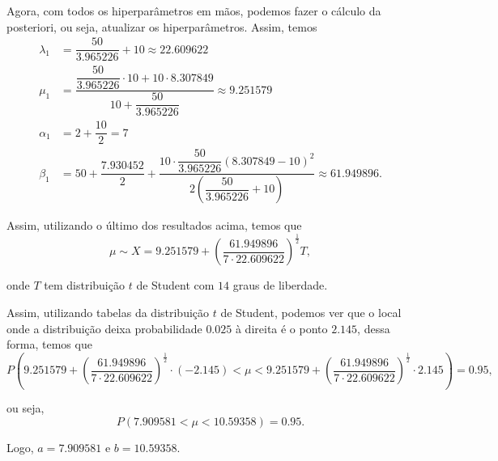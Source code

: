 \documentclass{article}
\begin{document}
Agora, com todos os hiperparâmetros em mãos, podemos fazer o cálculo da posteriori, ou seja, atualizar os hiperparâmetros. Assim, temos
\begin{equation*}
    \begin{split}
        \lambda_1 & = \dfrac{50}{3.965226} + 10 \approx 22.609622 \\
        \mu_1 & = \dfrac{\dfrac{50}{3.965226}\cdot 10 + 10\cdot 8.307849}{10 + \dfrac{50}{3.965226}} \approx 9.251579 \\
        \alpha_1 & = 2 + \dfrac{10}{2} = 7 \\
        \beta_1 & = 50 + \dfrac{7.930452}{2} + \dfrac{10\cdot \dfrac{50}{3.965226}\left(8.307849 - 10\right)^2}{2\left(\dfrac{50}{3.965226} + 10\right)} \approx 61.949896.
    \end{split}
\end{equation*}

Assim, utilizando o último dos resultados acima, temos que
\[\mu \sim X = 9.251579 + \left(\dfrac{61.949896}{7\cdot 22.609622}\right)^{\frac{1}{2}}T,\]

\noindent onde $T$ tem distribuição $t$ de Student com $14$ graus de liberdade.

Assim, utilizando tabelas da distribuição $t$ de Student, podemos ver que o local onde a distribuição deixa probabilidade $0.025$ à direita é o ponto $2.145$, dessa forma, temos que
\[P\left(9.251579 + \left(\dfrac{61.949896}{7\cdot 22.609622}\right)^{\frac{1}{2}}\cdot (-2.145) < \mu < 9.251579 + \left(\dfrac{61.949896}{7\cdot 22.609622}\right)^{\frac{1}{2}}\cdot 2.145\right) = 0.95,\]

\noindent ou seja,
\[P\left(7.909581 < \mu < 10.59358\right) = 0.95.\]

Logo, $a = 7.909581$ e $b = 10.59358$.








\printbibliography
\end{document}
